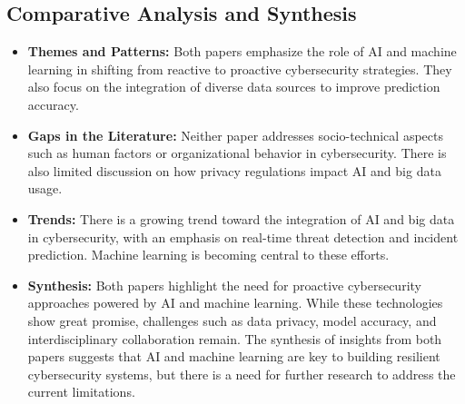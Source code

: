 \documentclass[12pt]{article}
\begin{document}
\subsection{Comparative Analysis and Synthesis}

\begin{itemize}
    \item \textbf{Themes and Patterns:} Both papers emphasize the role of AI and machine learning in shifting from reactive to proactive cybersecurity strategies. They also focus on the integration of diverse data sources to improve prediction accuracy.
    
    \item \textbf{Gaps in the Literature:} Neither paper addresses socio-technical aspects such as human factors or organizational behavior in cybersecurity. There is also limited discussion on how privacy regulations impact AI and big data usage.
    
    \item \textbf{Trends:} There is a growing trend toward the integration of AI and big data in cybersecurity, with an emphasis on real-time threat detection and incident prediction. Machine learning is becoming central to these efforts.
    
    \item \textbf{Synthesis:} Both papers highlight the need for proactive cybersecurity approaches powered by AI and machine learning. While these technologies show great promise, challenges such as data privacy, model accuracy, and interdisciplinary collaboration remain. The synthesis of insights from both papers suggests that AI and machine learning are key to building resilient cybersecurity systems, but there is a need for further research to address the current limitations.
\end{itemize}
\end{document}
